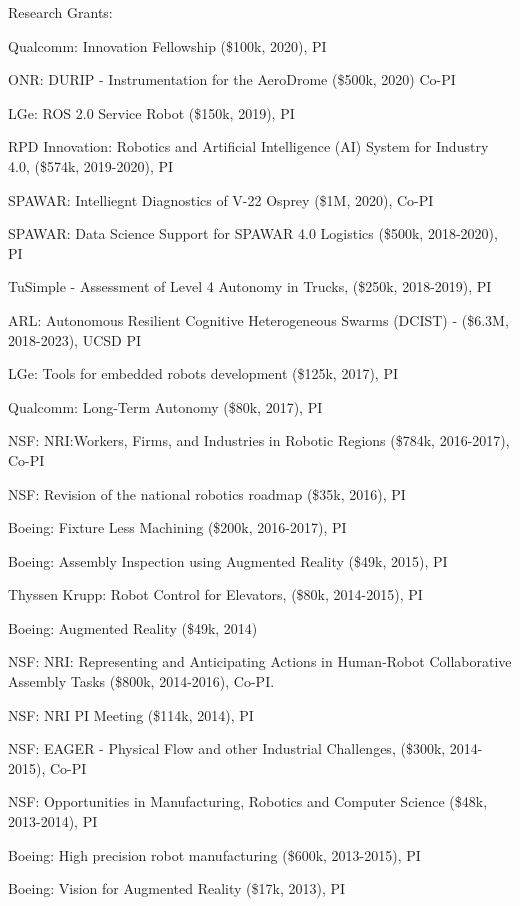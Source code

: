 \documentclass{article}
\begin{document}
\begin{cv}
\begin{cvlist}{Research Grants:}
\item Qualcomm: Innovation Fellowship (\$100k, 2020), PI
\item ONR: DURIP - Instrumentation for the AeroDrome (\$500k, 2020) Co-PI
\item LGe: ROS 2.0 Service Robot (\$150k, 2019), PI   
\item RPD Innovation: Robotics and Artificial Intelligence (AI) System for 
  Industry 4.0, (\$574k, 2019-2020), PI 
\item SPAWAR: Intelliegnt Diagnostics of V-22 Osprey (\$1M, 2020), Co-PI   
\item SPAWAR: Data Science Support for SPAWAR 4.0 Logistics (\$500k,
  2018-2020), PI
\item TuSimple - Assessment of Level 4 Autonomy in Trucks,  (\$250k,
  2018-2019), PI
\item ARL: Autonomous Resilient Cognitive Heterogeneous Swarms
  (DCIST) - (\$6.3M, 2018-2023), UCSD PI
\item LGe: Tools for embedded robots development (\$125k, 2017), PI
\item Qualcomm: Long-Term Autonomy (\$80k, 2017), PI
\item NSF: NRI:Workers, Firms, and Industries in Robotic Regions
  (\$784k, 2016-2017), Co-PI
\item NSF: Revision of the national robotics roadmap (\$35k, 2016), PI
\item Boeing: Fixture Less Machining (\$200k, 2016-2017), PI
\item Boeing: Assembly Inspection using Augmented Reality (\$49k,
  2015), PI
\item Thyssen Krupp: Robot Control for Elevators, (\$80k, 2014-2015), PI
\item Boeing: Augmented Reality (\$49k, 2014)
\item NSF: NRI: Representing and Anticipating Actions in Human-Robot
  Collaborative Assembly Tasks (\$800k, 2014-2016), Co-PI.
\item NSF: NRI PI Meeting (\$114k, 2014), PI
\item NSF: EAGER - Physical Flow and other Industrial Challenges,
  (\$300k, 2014-2015), Co-PI
\item NSF: Opportunities in Manufacturing, Robotics and Computer Science
  (\$48k, 2013-2014), PI
\item Boeing: High precision robot manufacturing (\$600k, 2013-2015), PI
\item Boeing: Vision for Augmented Reality (\$17k, 2013), PI

\end{cvlist}
\end{cv}
\end{document}
